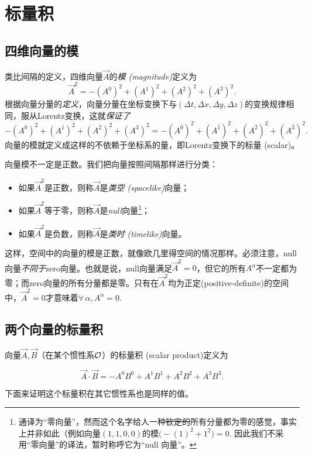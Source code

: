 \section{标量积}
\label{sec2.5}

\subsection*{四维向量的模}
类比间隔的定义，四维向量$\vec{A}$的\textit{模 (magnitude)}定义为
\begin{equation}
    \vec{A}^2 = -(A^0)^2 + (A^1)^2 + (A^2)^2 + (A^3)^2.
\label{equ2.24}
\end{equation}
根据向量分量的\textit{定义}，向量分量在坐标变换下与$(\Delta t, \Delta x, \Delta y, \Delta z)$的变换规律相同，服从Lorentz变换，这就\textit{保证了}
\begin{equation}
    -(A^0)^2 + (A^1)^2 + (A^2)^2 + (A^3)^2 = -(A^{\bar{0}})^2 + (A^{\bar{1}})^2 + (A^{\bar{2}})^2 + (A^{\bar{3}})^2.
\label{equ2.25}
\end{equation}
向量的模就定义成这样的不依赖于坐标系的量，即Lorentz变换下的标量 (scalar)。

向量模不一定是正数。我们把向量按照间隔那样进行分类：
\begin{itemize}
    \item 如果$\vec{A}^2$是正数，则称$\vec{A}$是\textit{类空 (spacelike)}向量；
    \item 如果$\vec{A}^2$等于零，则称$\vec{A}$是\textit{null}向量\footnote{通译为“零向量”，然而这个名字给人一种\sout{钦定的}所有分量都为零的感觉，事实上并非如此（例如向量$(1, 1, 0, 0)$的模$\big( -(1)^2 + 1^2 \big) = 0$. 因此我们不采用“零向量”的译法，暂时称呼它为“null 向量”。}；
    \item 如果$\vec{A}^2$是负数，则称$\vec{A}$是\textit{类时 (timelike)}向量。
\end{itemize}
这样，空间中的向量的模是正数，就像欧几里得空间的情况那样。必须注意，null向量\textit{不同于}zero向量。也就是说，null向量满足$\vec{A}^2 = 0$，但它的所有$A^\alpha$不一定都为零；而zero向量的所有分量都是零。只有在$\vec{A}^2$均为正定(positive-definite)的空间中，$\vec{A}^2 = 0$才意味着$\forall\, \alpha, A^\alpha = 0$.

\subsection*{两个向量的标量积}
向量$\vec{A}, \vec{B}$（在某个惯性系$\mathcal{O}$）的标量积 (scalar product)定义为
\begin{shaded}
\begin{equation}
    \vec{A} \cdot \vec{B} = -A^0 B^0 + A^1 B^1 + A^2 B^2 + A^3 B^3.
\label{equ2.26}
\end{equation}
\end{shaded}
下面来证明这个标量积在其它惯性系也是同样的值。

